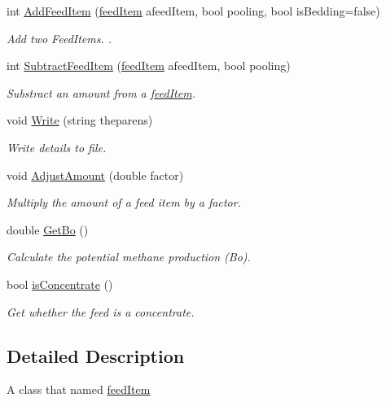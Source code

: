 \begin{DoxyCompactItemize}
int \mbox{\hyperlink{classfeed_item_a9d4d5c145e4196c035034388e8d0a9a4}{Add\+Feed\+Item}} (\mbox{\hyperlink{classfeed_item}{feed\+Item}} afeed\+Item, bool pooling, bool is\+Bedding=false)
\begin{DoxyCompactList}\small\item\em Add two Feed\+Items. . \end{DoxyCompactList}\item 
int \mbox{\hyperlink{classfeed_item_a25b913edb05531ddef50ca8aa05e960d}{Subtract\+Feed\+Item}} (\mbox{\hyperlink{classfeed_item}{feed\+Item}} afeed\+Item, bool pooling)
\begin{DoxyCompactList}\small\item\em Substract an amount from a \mbox{\hyperlink{classfeed_item}{feed\+Item}}. \end{DoxyCompactList}\item 
void \mbox{\hyperlink{classfeed_item_a54c2b2dcc473131ba9ef87e66e716eac}{Write}} (string theparens)
\begin{DoxyCompactList}\small\item\em Write details to file. \end{DoxyCompactList}\item 
void \mbox{\hyperlink{classfeed_item_a1030acf7c0e8e9b1b8ca865c800142c2}{Adjust\+Amount}} (double factor)
\begin{DoxyCompactList}\small\item\em Multiply the amount of a feed item by a factor. \end{DoxyCompactList}\item 
double \mbox{\hyperlink{classfeed_item_afb82b1257ec3d3e9cb1dedae71273557}{Get\+Bo}} ()
\begin{DoxyCompactList}\small\item\em Calculate the potential methane production (Bo). \end{DoxyCompactList}\item 
bool \mbox{\hyperlink{classfeed_item_a6c014cb057ccf54655d47d29d10101c9}{is\+Concentrate}} ()
\begin{DoxyCompactList}\small\item\em Get whether the feed is a concentrate. \end{DoxyCompactList}\end{DoxyCompactItemize}


\subsection{Detailed Description}
A class that named \mbox{\hyperlink{classfeed_item}{feed\+Item}} 

